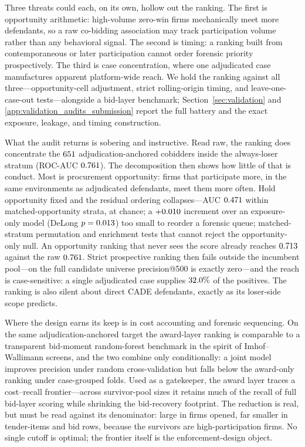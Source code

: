 Three threats could each, on its own, hollow out the ranking. The
first is opportunity arithmetic: high-volume zero-win firms
mechanically meet more defendants, so a raw co-bidding association may
track participation volume rather than any behavioral signal. The
second is timing: a ranking built from contemporaneous or later
participation cannot order forensic priority prospectively. The third
is case concentration, where one adjudicated case manufactures
apparent platform-wide reach. We hold the ranking against all
three---opportunity-cell adjustment, strict rolling-origin timing, and
leave-one-case-out tests---alongside a bid-layer benchmark;
Section~\ref{sec:validation} and
\ref{app:validation_audits_submission} report the full battery and the
exact exposure, leakage, and timing construction.

What the audit returns is sobering and instructive. Read raw, the
ranking does concentrate the $651$ adjudication-anchored
cobidders inside the always-loser stratum (ROC-AUC
$0.761$). The decomposition then shows how little of that
is conduct. Most is procurement opportunity: firms that participate
more, in the same environments as adjudicated defendants, meet them
more often. Hold opportunity fixed and the residual ordering
collapses---AUC $0.471$ within matched-opportunity strata,
at chance; a $+0.010$ increment over an exposure-only model
(DeLong $p=0.013$) too small to reorder a forensic queue;
matched-stratum permutation and enrichment tests that cannot reject
the opportunity-only null. An opportunity ranking that never sees the
score already reaches $0.713$ against the raw
$0.761$. Strict prospective ranking then fails outside the
incumbent pool---on the full candidate universe precision@500 is
exactly zero---and the reach is case-sensitive: a single adjudicated
case supplies $32.0\%$ of the positives. The ranking is
also silent about direct CADE defendants, exactly as its loser-side
scope predicts.

Where the design earns its keep is in cost accounting and forensic
sequencing. On the same adjudication-anchored target the award-layer
ranking is comparable to a transparent bid-moment random-forest
benchmark in the spirit of Imhof--Wallimann screens, and the two
combine only conditionally: a joint model improves precision under
random cross-validation but falls below the award-only ranking under
case-grouped folds. Used as a gatekeeper, the award layer traces a
cost--recall frontier---across survivor-pool sizes it retains much of
the recall of full bid-layer scoring while shrinking the bid-recovery
footprint. The reduction is real, but must be read against its
denominator: large in firms opened, far smaller in tender-items and
bid rows, because the survivors are high-participation firms. No
single cutoff is optimal; the frontier itself is the
enforcement-design object.

